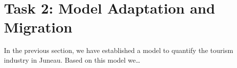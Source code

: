 \section{Task 2: Model Adaptation and Migration}

In the previous section, we have established a model to quantify 
the tourism industry in Juneau. 
Based on this model we\dots